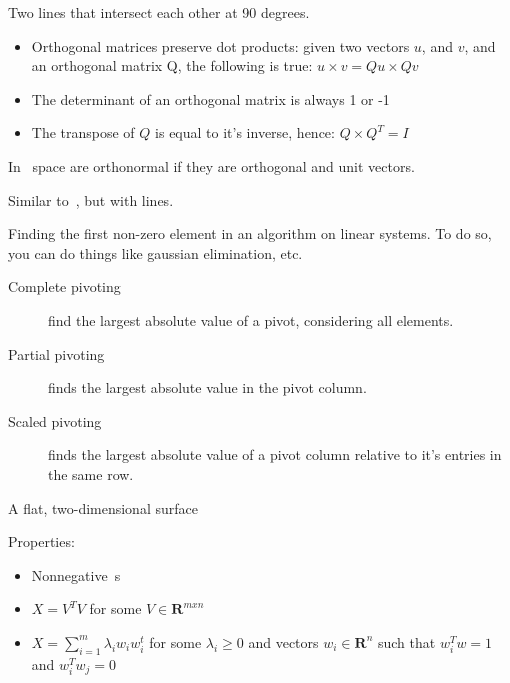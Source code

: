 \begin{definition}[Orthogonal]\label{orthogonal}
    Two lines that intersect each other at 90 degrees.\\
    \begin{itemize}
        \item Orthogonal matrices preserve dot products:
        given two vectors $u$, and $v$, and an orthogonal matrix Q,
        the following is true:
        $u \times v = Qu \times Qv$
        \item The determinant of an orthogonal matrix is always 1 or -1
        \item The transpose of $Q$ is equal to it's inverse, hence:
            $Q \times Q^{T} = I$
    \end{itemize}
\end{definition}

\begin{definition}[Orthonormal]
    In~ space are orthonormal if they are
    orthogonal and unit vectors.
\end{definition}


\begin{definition}[Perpendicular]
    Similar to~, but with lines.
\end{definition}

\begin{definition}[Pivoting]
    Finding the first non-zero element in an algorithm on linear systems.
    To do so, you can do things like gaussian elimination, etc.
    \begin{description}
        \item[Complete pivoting] find the largest absolute value of a pivot,
            considering all elements.
        \item[Partial pivoting] finds the largest absolute value in the pivot
            column.
        \item[Scaled pivoting] finds the largest absolute value of a pivot
            column relative to it's entries in the same row.
    \end{description}
\end{definition}

\begin{definition}[Plane]
    A flat, two-dimensional surface
\end{definition}

\begin{definition}
    Properties:
    \begin{itemize}
        \item Nonnegative~s
        \item $X = V^{T}V$ for some $V \in \mathbf{R}^{mxn}$
        \item $X = \sum\limits_{i=1}^{m}\lambda_{i}w_{i}w^{t}_{i}$ 
            for some $\lambda_{i} \geq 0$ and vectors $w_{i} \in \mathbf{R}^{n}$
            such that $w^{T}_{i}w = 1$ and $w^{T}_{i}w_{j} = 0$

    \end{itemize}
\end{definition}

